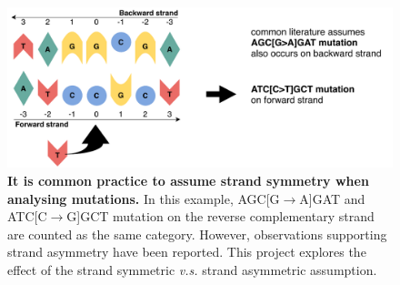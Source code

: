 \begin{figure}[h!]
    \centering
    \includegraphics[scale=0.78]{graphics/motif_symmetric_demo.pdf}
    \caption{\textbf{It is common practice to assume strand symmetry when analysing mutations.} In this example, AGC[G$\rightarrow$A]GAT and ATC[C$\rightarrow$G]GCT mutation on the reverse complementary strand are counted as the same category. However, observations supporting strand asymmetry have been reported. This project explores the effect of the strand symmetric \textit{v.s.} strand asymmetric assumption.}
    \label{fig:motif_symmetric_demo}
\end{figure}
